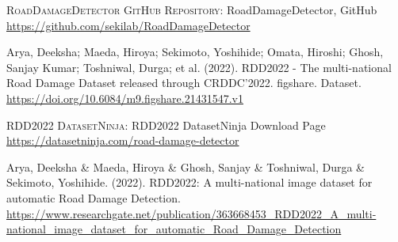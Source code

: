 
\begin{thebibliography}{10}

        \textsc{RoadDamageDetector GitHub Repository}:
        RoadDamageDetector, GitHub
        \url{https://github.com/sekilab/RoadDamageDetector}

    Arya, Deeksha; Maeda, Hiroya; Sekimoto, Yoshihide; Omata, Hiroshi; Ghosh, Sanjay Kumar; Toshniwal, Durga; et al. (2022). RDD2022 - The multi-national Road Damage Dataset released through CRDDC'2022. figshare. Dataset. \url{https://doi.org/10.6084/m9.figshare.21431547.v1}

        \textsc{RDD2022 DatasetNinja}:
        RDD2022 DatasetNinja Download Page
        \url{https://datasetninja.com/road-damage-detector}

        Arya, Deeksha \& Maeda, Hiroya \& Ghosh, Sanjay \& Toshniwal, Durga \& Sekimoto, Yoshihide. (2022). RDD2022: A multi-national image dataset for automatic Road Damage Detection. 
        \url{https://www.researchgate.net/publication/363668453_RDD2022_A_multi-national_image_dataset_for_automatic_Road_Damage_Detection}
    
  \end{thebibliography}
  